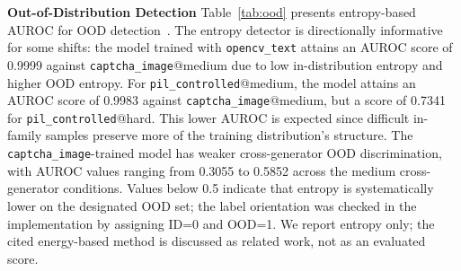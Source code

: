 \documentclass[pdflatex,sn-mathphys-num,iicol]{sn-jnl}
\begin{document}
\textbf{Out-of-Distribution Detection}
Table~\ref{tab:ood} presents entropy-based AUROC for OOD detection~\cite{hendrycks2017baseline,liang2018enhancing}.
The entropy detector is directionally informative for some shifts: the model trained with \texttt{opencv\_text} attains an AUROC score of 0.9999 against
\texttt{captcha\_image}@medium due to low in-distribution entropy and higher OOD entropy. For \texttt{pil\_controlled}@medium, the model attains an AUROC score of 0.9983 against \texttt{captcha\_image}@medium, but a score of 0.7341 for \texttt{pil\_controlled}@hard. This lower AUROC is expected since difficult in-family samples preserve more of the training distribution's structure.
The \texttt{captcha\_image}-trained model has weaker cross-generator OOD discrimination, with AUROC values ranging from 0.3055 to 0.5852 across the medium cross-generator conditions. Values below 0.5 indicate that entropy is systematically lower on the designated OOD set; the label orientation was checked in the implementation by assigning ID=0 and OOD=1. We report entropy only; the cited energy-based method is discussed as related work, not as an evaluated score.
\end{document}
